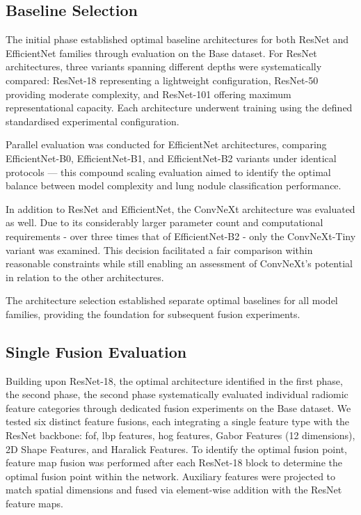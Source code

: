 \subsection{Baseline Selection}
The initial phase established optimal baseline architectures for both ResNet and EfficientNet families through evaluation on the Base dataset. For ResNet architectures, three variants spanning different depths were systematically compared: ResNet-18 representing a lightweight configuration, ResNet-50 providing moderate complexity, and ResNet-101 offering maximum representational capacity. Each architecture underwent training using the defined standardised experimental configuration.

Parallel evaluation was conducted for EfficientNet architectures, comparing EfficientNet-B0, EfficientNet-B1, and EfficientNet-B2 variants under identical protocols — this compound scaling evaluation aimed to identify the optimal balance between model complexity and lung nodule classification performance.

In addition to ResNet and EfficientNet, the ConvNeXt architecture was evaluated as well. Due to its considerably larger parameter count and computational requirements - over three times that of EfficientNet-B2 - only the ConvNeXt-Tiny variant was examined. This decision facilitated a fair comparison within reasonable constraints while still enabling an assessment of ConvNeXt's potential in relation to the other architectures.

The architecture selection established separate optimal baselines for all model families, providing the foundation for subsequent fusion experiments.

\subsection{Single Fusion Evaluation}
Building upon ResNet-18, the optimal architecture identified in the first phase, the second phase, the second phase systematically evaluated individual radiomic feature categories through dedicated fusion experiments on the Base dataset. We tested six distinct feature fusions, each integrating a single feature type with the ResNet backbone: \ac{fof}, \ac{lbp} features, \ac{hog} features, Gabor Features (12 dimensions), 2D Shape Features, and Haralick Features.
To identify the optimal fusion point, feature map fusion was performed after each ResNet-18 block to determine the optimal fusion point within the network. Auxiliary features were projected to match spatial dimensions and fused via element-wise addition with the ResNet feature maps. %

